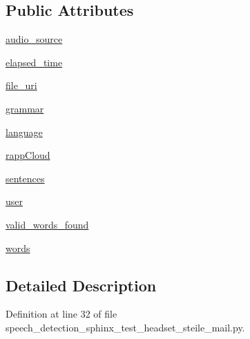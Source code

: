 \subsection*{Public Attributes}
\begin{DoxyCompactItemize}
\item 
\hyperlink{classspeech__detection__sphinx__test__headset__steile__mail_1_1RappInterfaceTest_a55261c1c0780da83008a5a7350b7c92b}{audio\-\_\-source}
\item 
\hyperlink{classspeech__detection__sphinx__test__headset__steile__mail_1_1RappInterfaceTest_a73029b423f48d57aef0ca43126dec755}{elapsed\-\_\-time}
\item 
\hyperlink{classspeech__detection__sphinx__test__headset__steile__mail_1_1RappInterfaceTest_a52b778bf75da2710dfe12a92b8133d96}{file\-\_\-uri}
\item 
\hyperlink{classspeech__detection__sphinx__test__headset__steile__mail_1_1RappInterfaceTest_a59030616e731206d87a98fb6b086a6f9}{grammar}
\item 
\hyperlink{classspeech__detection__sphinx__test__headset__steile__mail_1_1RappInterfaceTest_ac9793395bf379b6e14bf7510c91e0669}{language}
\item 
\hyperlink{classspeech__detection__sphinx__test__headset__steile__mail_1_1RappInterfaceTest_a098b9d65b11679478f4089f6e4b87c99}{rapp\-Cloud}
\item 
\hyperlink{classspeech__detection__sphinx__test__headset__steile__mail_1_1RappInterfaceTest_a2b0a1dc368446815d3b8ecc3dcd0a588}{sentences}
\item 
\hyperlink{classspeech__detection__sphinx__test__headset__steile__mail_1_1RappInterfaceTest_ad340706e7650d368b0c6fbf3eaa8e801}{user}
\item 
\hyperlink{classspeech__detection__sphinx__test__headset__steile__mail_1_1RappInterfaceTest_a74a33a32932e88ab5786f90fd23f89bd}{valid\-\_\-words\-\_\-found}
\item 
\hyperlink{classspeech__detection__sphinx__test__headset__steile__mail_1_1RappInterfaceTest_a4a16408fdb79c0dfaa0d31b791439b20}{words}
\end{DoxyCompactItemize}


\subsection{Detailed Description}


Definition at line 32 of file speech\-\_\-detection\-\_\-sphinx\-\_\-test\-\_\-headset\-\_\-steile\-\_\-mail.\-py.



